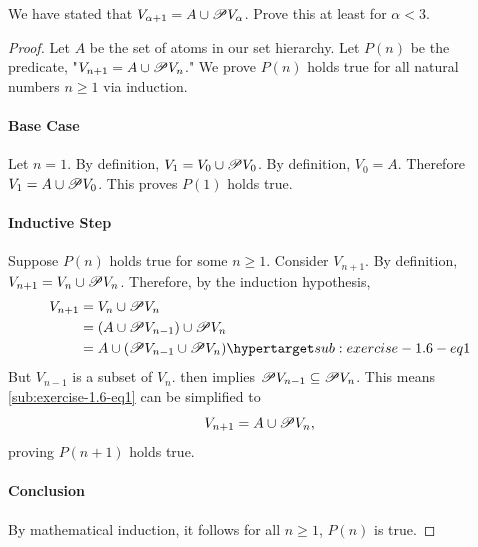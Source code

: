 \documentclass{report}
\begin{document}
  We have stated that $V_{\alpha + 1} = A \cup \mathscr{P}V_\alpha$.
  Prove this at least for $\alpha < 3$.

  \begin{proof}

    Let $A$ be the set of atoms in our set hierarchy.
    Let $P(n)$ be the predicate, "$V_{n + 1} = A \cup \mathscr{P}V_n$."
    We prove $P(n)$ holds true for all natural numbers $n \geq 1$ via induction.

    \paragraph{Base Case}%

      Let $n = 1$.
      By definition, $V_1 = V_0 \cup \mathscr{P}V_0$.
      By definition, $V_0 = A$.
      Therefore $V_1 = A \cup \mathscr{P}V_0$.
      This proves $P(1)$ holds true.

    \paragraph{Inductive Step}%

      Suppose $P(n)$ holds true for some $n \geq 1$.
      Consider $V_{n+1}$.
      By definition, $V_{n+1} = V_n \cup \mathscr{P}V_n$.
      Therefore, by the induction hypothesis,
        \begin{align}
          V_{n+1}
            & = V_n \cup \powerset{V_n}
              \nonumber \\
            & = (A \cup \powerset{V_{n-1}}) \cup \powerset{V_n}
              \nonumber \\
            & = A \cup (\powerset{V_{n-1}} \cup \powerset{V_n})
              \hyperlabel{sub:exercise-1.6-eq1}
        \end{align}
      But $V_{n-1}$ is a subset of $V_n$.
       then implies
        $\mathscr{P}V_{n-1} \subseteq \mathscr{P}V_n$.
      This means \eqref{sub:exercise-1.6-eq1} can be simplified to
        $$V_{n+1} = A \cup \mathscr{P}V_n,$$
      proving $P(n+1)$ holds true.

    \paragraph{Conclusion}%

      By mathematical induction, it follows for all $n \geq 1$, $P(n)$ is true.

  \end{proof}
\end{document}
